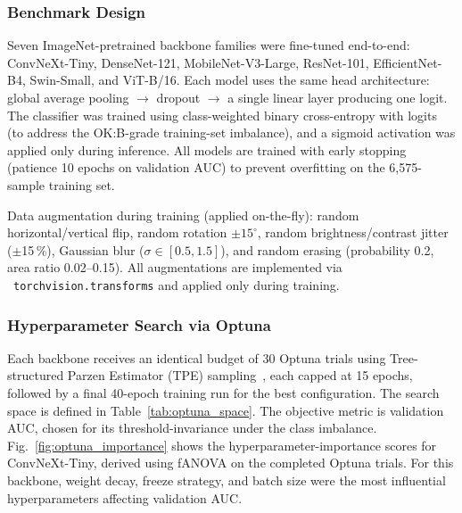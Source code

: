 \documentclass[conference]{IEEEtran}
\begin{document}
\subsubsection{Benchmark Design}
Seven ImageNet-pretrained backbone families were fine-tuned end-to-end: ConvNeXt-Tiny, DenseNet-121, MobileNet-V3-Large, ResNet-101, EfficientNet-B4, Swin-Small, and ViT-B/16. Each model uses the same head architecture: global average pooling $\to$ dropout $\to$ a single linear layer producing one logit. The classifier was trained using class-weighted binary cross-entropy with logits (to address the OK:B-grade training-set imbalance), and a sigmoid activation was applied only during inference. All models are trained with early stopping (patience 10 epochs on validation AUC) to prevent overfitting on the 6{,}575-sample training set.

Data augmentation during training (applied on-the-fly): random horizontal/vertical flip, random rotation $\pm15^\circ$, random brightness/contrast jitter ($\pm$15\,\%), Gaussian blur ($\sigma \in [0.5, 1.5]$), and random erasing (probability 0.2, area ratio 0.02--0.15). All augmentations are implemented via \ \texttt{torchvision.transforms} and applied only during training.

\subsubsection{Hyperparameter Search via Optuna}
Each backbone receives an identical budget of 30 Optuna trials using Tree-structured Parzen Estimator (TPE) sampling~\cite{akiba2019}, each capped at 15 epochs, followed by a final 40-epoch training run for the best configuration. The search space is defined in Table~\ref{tab:optuna_space}. The objective metric is validation AUC, chosen for its threshold-invariance under the class imbalance. Fig.~\ref{fig:optuna_importance} shows the hyperparameter-importance scores for ConvNeXt-Tiny, derived using fANOVA on the completed Optuna trials. For this backbone, weight decay, freeze strategy, and batch size were the most influential hyperparameters affecting validation AUC.
\end{document}
